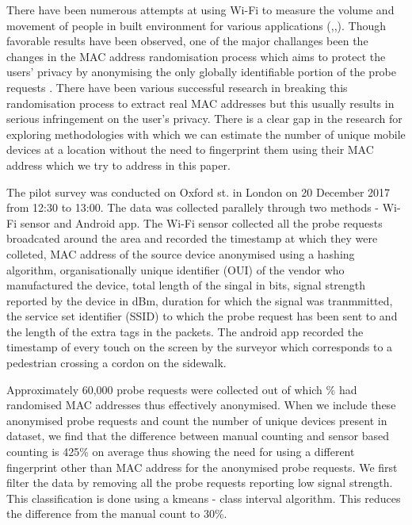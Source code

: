 \documentclass[11t, a4paper, twocolumn]{article}
\begin{document}
	There have been numerous attempts at using Wi-Fi
	to measure the volume and movement of people in built environment for various
	applications (\citep{zarim2006},\citep{sap2015},\citep{reki2007}).
	Though favorable results have been observed, one of the major 
	challanges been the changes in the MAC address randomisation process which 
	aims to protect the users' privacy by anonymising the only globally identifiable
	portion of the probe requests \citep{green2008}. There have been various 
	successful research in breaking this
	randomisation process to extract real MAC addresses \citep{martin2017}
	but this usually results in serious infringement on the user's
	privacy. There is a clear gap in the research for
	exploring methodologies with which we can estimate the
	number of unique mobile devices at a location without the need to fingerprint
	them using their MAC address which we try to address in this paper.

	The pilot survey was conducted on Oxford st. in London on 20 December 2017 from 12:30 to
	13:00. The data was collected parallely through two methods - Wi-Fi sensor and Android app.
	The Wi-Fi sensor collected all the probe requests broadcated around the area
	and recorded the timestamp at which they were colleted, MAC address of the source
	device anonymised using a hashing algorithm, organisationally unique identifier (OUI) of the
	vendor who manufactured the device, total length of the singal in bits, signal
	strength reported by the device in dBm, duration for which the signal was tranmmitted, 
	the service set identifier (SSID) to which the probe request has been sent to and the
	length of the extra tags in the packets. The android app recorded the timestamp
	of every touch on the screen by the surveyor which corresponds to a pedestrian 
	crossing a cordon on the sidewalk. 

	Approximately 60,000 probe requests were collected out of which   \% had
	randomised MAC addresses thus effectively anonymised.
	When we include these anonymised probe requests and count the number of unique
	devices present in dataset, we find that the difference between manual counting and sensor based counting
	is 425\% on average thus showing the need for using a different fingerprint other than MAC address for the
	anonymised probe requests. We first filter the data by removing all the probe requests reporting
	low signal strength. This classification is done using a kmeans - class interval algorithm.
	This reduces the difference from the manual count to 30\%.
\end{document}
